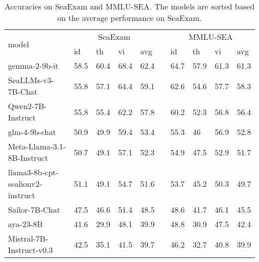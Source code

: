 \begin{table*}[!ht]
    \centering
    \small
    \begin{tabular}{llllllllll}
        \toprule
         \multirow{2}{*}{model}& \multicolumn{4}{c}{SeaExam} & & \multicolumn{4}{c}{MMLU-SEA} \\ 
         \cmidrule{2-5} \cmidrule{7-10}
        & id & th & vi & avg & & id & th & vi & avg \\ 
        \midrule
        gemma-2-9b-it & 58.5 & 60.4 & 68.4 & 62.4 & & 64.7 & 57.9 & 61.3 & 61.3 \\ 
        SeaLLMs-v3-7B-Chat & 55.8 & 57.1 & 64.4 & 59.1 & & 62.6 & 54.6 & 57.7 & 58.3 \\ 
        Qwen2-7B-Instruct & 55.8 & 55.4 & 62.2 & 57.8 & & 60.2 & 52.3 & 56.8 & 56.4 \\ 
        glm-4-9b-chat & 50.9 & 49.9 & 59.4 & 53.4 & & 55.3 & 46 & 56.9 & 52.8 \\ 
        Meta-Llama-3.1-8B-Instruct & 50.7 & 49.1 & 57.1 & 52.3 & & 54.9 & 47.5 & 52.9 & 51.7 \\ 
        llama3-8b-cpt-sealionv2-instruct & 51.1 & 49.1 & 54.7 & 51.6 & & 53.7 & 45.2 & 50.3 & 49.7 \\ 
        Sailor-7B-Chat & 47.5 & 46.6 & 51.4 & 48.5 & & 48.6 & 41.7 & 46.1 & 45.5 \\ 
        aya-23-8B & 41.6 & 29.9 & 48.1 & 39.9 & & 48.8 & 30.9 & 47.5 & 42.4 \\ 
        Mistral-7B-Instruct-v0.3 & 42.5 & 35.1 & 41.5 & 39.7 & & 46.2 & 32.7 & 40.8 & 39.9 \\ 
        \bottomrule
    \end{tabular}
    \caption{Accuracies on SeaExam and MMLU-SEA. The models are sorted based on the average performance on SeaExam.}
    \label{tab:SeaExam_results}
\end{table*}


